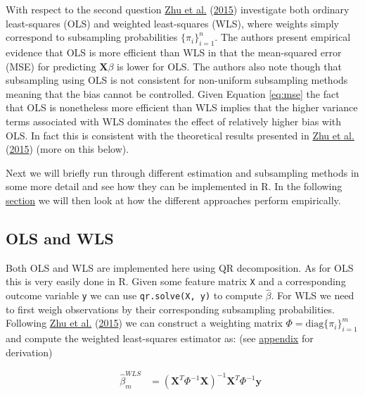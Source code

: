 \documentclass[
]{book}
\begin{document}
With respect to the second question \protect\hyperlink{ref-zhu2015optimal}{Zhu et al.} (\protect\hyperlink{ref-zhu2015optimal}{2015}) investigate both ordinary least-squares (OLS) and weighted least-squares (WLS), where weights simply correspond to subsampling probabilities \(\{\pi_i\}^n_{i=1}\). The authors present empirical evidence that OLS is more efficient than WLS in that the mean-squared error (MSE) for predicting \(\mathbf{X} \beta\) is lower for OLS. The authors also note though that subsampling using OLS is not consistent for non-uniform subsampling methods meaning that the bias cannot be controlled. Given Equation \eqref{eq:mse} the fact that OLS is nonetheless more efficient than WLS implies that the higher variance terms associated with WLS dominates the effect of relatively higher bias with OLS. In fact this is consistent with the theoretical results presented in \protect\hyperlink{ref-zhu2015optimal}{Zhu et al.} (\protect\hyperlink{ref-zhu2015optimal}{2015}) (more on this below).

Next we will briefly run through different estimation and subsampling methods in some more detail and see how they can be implemented in R. In the following \protect\hyperlink{lin-reg}{section} we will then look at how the different approaches perform empirically.

\hypertarget{ols-and-wls}{%
\subsection{OLS and WLS}\label{ols-and-wls}}

Both OLS and WLS are implemented here using QR decomposition. As for OLS this is very easily done in R. Given some feature matrix \texttt{X} and a corresponding outcome variable \texttt{y} we can use \texttt{qr.solve(X,\ y)} to compute \(\hat\beta\). For WLS we need to first weigh observations by their corresponding subsampling probabilities. Following \protect\hyperlink{ref-zhu2015optimal}{Zhu et al.} (\protect\hyperlink{ref-zhu2015optimal}{2015}) we can construct a weighting matrix \(\Phi= \text{diag}\{\pi_i\}^m_{i=1}\) and compute the weighted least-squares estimator as: (see \protect\hyperlink{app-wls}{appendix} for derivation)

\[
\begin{equation} 
\begin{aligned}
&& \hat\beta_m^{WLS}&= \left( \mathbf{X}^T \Phi^{-1} \mathbf{X} \right)^{-1} \mathbf{X}^T\Phi^{-1}\mathbf{y}\\
\end{aligned}
\label{eq:wls}
\end{equation}
\]
\end{document}

